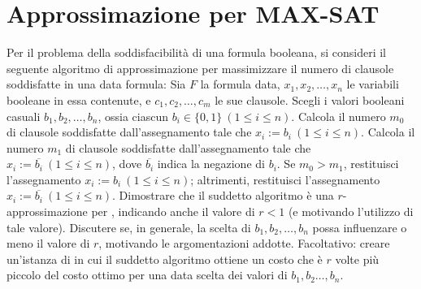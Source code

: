 \chapter{Approssimazione per MAX-SAT}

\begin{problem*}
  Per il problema \maxsat della soddisfacibilità di una formula 
  booleana, si consideri il seguente algoritmo di approssimazione 
  per massimizzare il numero di clausole soddisfatte in una data 
  formula: Sia \(F\) la formula data, \(x_1, x_2,\dots,x_n\) le
  variabili booleane in essa contenute, e \(c_1,c_2,\dots,c_m\)
  le sue clausole. Scegli i valori booleani casuali \(b_1,b_2,\dots,b_n\), 
  ossia ciascun \(b_i\in\{0, 1\}~(1 \le i \le n)\). Calcola il numero \(m_0\) 
  di clausole soddisfatte dall’assegnamento tale che \(x_i := b_i~ (1 \le i 
  \le n)\). Calcola il numero \(m_1\) di clausole soddisfatte 
  dall’assegnamento tale che \(x_i := \overline{b_i}~(1 \le i \le n)\), dove 
  \(\overline{b_i}\) indica la negazione di \(b_i\). Se \(m_0 > m_1\), 
  restituisci l’assegnamento \(x_i := b_i ~(1\le i\le n)\); altrimenti, 
  restituisci l’assegnamento \(x_i := \overline{b_i}~(1 \le i \le n)\). 
  Dimostrare che il suddetto algoritmo è una \(r\)-approssimazione per 
  \maxsat, indicando anche il valore di \(r < 1\) (e motivando l’utilizzo di 
  tale valore). Discutere se, in generale, la scelta di \(b_1,b_2,\dots,b_n\) 
  possa influenzare o meno il valore di \(r\), motivando le argomentazioni 
  addotte. Facoltativo: creare un’istanza di \maxsat in cui il suddetto 
  algoritmo ottiene un costo che è \(r\) volte più piccolo del costo ottimo 
  per una data scelta dei valori di \(b_1,b_2\dots,b_n\).
\end{problem*} 

